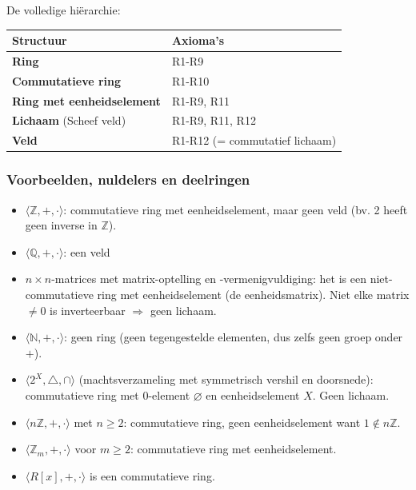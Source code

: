 De volledige hiërarchie:

\begin{center}
    \renewcommand{\arraystretch}{1.5}
    \begin{tabularx}{\linewidth}{@{} >{\hsize}L >{\hsize}L @{}}
        \textbf{Structuur} & \textbf{Axioma's} \\
        \hline
        \textbf{Ring} & R1-R9  \\
        \thinrule
        \textbf{Commutatieve ring} & R1-R10  \\
        \thinrule
        \textbf{Ring met eenheidselement} & R1-R9, R11  \\
        \thinrule
        \textbf{Lichaam} (Scheef veld) & R1-R9, R11, R12  \\
        \thinrule
        \textbf{Veld} & R1-R12 (= commutatief lichaam)  \\
        \hline
    \end{tabularx}
\end{center}

\subsubsection{Voorbeelden, nuldelers en deelringen}


\begin{itemize}
    \item $\langle \mathbb{Z}, +, \cdot \rangle$: commutatieve ring met eenheidselement, maar geen veld (bv. 2 heeft geen inverse in $\mathbb{Z}$).
    \item $\langle \mathbb{Q}, +, \cdot \rangle$: een veld
    \item $n \times n$-matrices met matrix-optelling en -vermenigvuldiging: het is een niet-commutatieve ring met eenheidselement (de eenheidsmatrix). Niet elke matrix $\neq0$ is inverteerbaar $\Rightarrow$ geen lichaam.
    \item $\langle \mathbb{N}, +, \cdot \rangle$: geen ring (geen tegengestelde elementen, dus zelfs geen groep onder $+$).
    \item $\langle 2^X, \triangle, \cap \rangle$ (machtsverzameling met symmetrisch vershil en doorsnede): commutatieve ring met 0-element $\varnothing$ en eenheidselement $X$. Geen lichaam.
    \item $\langle n\mathbb{Z}, +, \cdot \rangle$ met $n \ge 2$: commutatieve ring, geen eenheidselement want $1 \notin n\mathbb{Z}$.
    \item $\langle \mathbb{Z}_m, +, \cdot \rangle$ voor $m \ge 2$: commutatieve ring met eenheidselement.
    \item $\langle R[x], +, \cdot \rangle$ is een commutatieve ring. 
\end{itemize}

